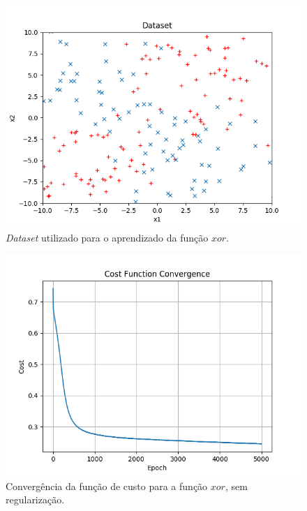 \documentclass[conference]{IEEEtran}
\begin{document}
\begin{figure}[htbp]
\centering
\centerline{\includegraphics[scale=0.5]{imagens/xor/lambda_zero/dataset_xor.png}}
\caption{\textit{Dataset} utilizado para o aprendizado da função $xor$.}
\label{xor/lambda_zero/dataset_xor}
\end{figure} 

\begin{figure}[htbp]
\centering
\centerline{\includegraphics[scale=0.5]{imagens/xor/lambda_zero/convergence_xor.png}}
\caption{Convergência da função de custo para a função $xor$, sem regularização.}
\label{xor/lambda_zero/convergence_xor}
\end{figure}
\end{document}

